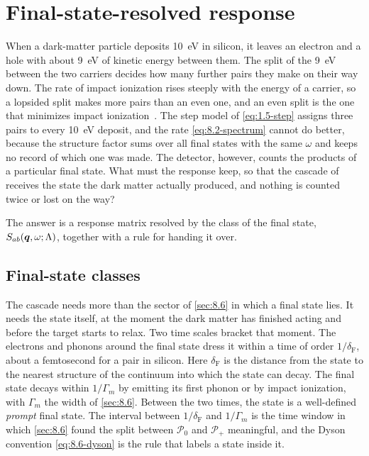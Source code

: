\section{Final-state-resolved response}\label{sec:8.7}

When a dark-matter particle deposits \SI{10}{eV} in silicon, it leaves an electron and a hole with about \SI{9}{eV} of kinetic energy between them. The split of the \SI{9}{eV} between the two carriers decides how many further pairs they make on their way down. The rate of impact ionization rises steeply with the energy of a carrier, so a lopsided split makes more pairs than an even one, and an even split is the one that minimizes impact ionization~\cite[Sect.~II\,A]{ramanathan2020ionization}. The step model of \cref{eq:1.5-step} assigns three pairs to every \SI{10}{eV} deposit, and the rate \cref{eq:8.2-spectrum} cannot do better, because the structure factor sums over all final states with the same $\omega$ and keeps no record of which one was made. The detector, however, counts the products of a particular final state. What must the response keep, so that the cascade of  receives the state the dark matter actually produced, and nothing is counted twice or lost on the way?

The answer is a response matrix resolved by the class of the final state, $S_{ab}(\bm{q},\omega;\Lambda)$, together with a rule for handing it over.

\subsection{Final-state classes}\label{sec:8.7-classes}

The cascade needs more than the sector of \cref{sec:8.6} in which a final state lies. It needs the state itself, at the moment the dark matter has finished acting and before the target starts to relax. Two time scales bracket that moment. The electrons and phonons around the final state dress it within a time of order $1/\delta_{\mathrm{F}}$, about a femtosecond for a pair in silicon. Here $\delta_{\mathrm{F}}$ is the distance from the state to the nearest structure of the continuum into which the state can decay. The final state decays within $1/\varGamma_m$ by emitting its first phonon or by impact ionization, with $\varGamma_m$ the width of \cref{sec:8.6}. Between the two times, the state is a well-defined \emph{prompt} final state. The interval between $1/\delta_{\mathrm{F}}$ and $1/\varGamma_m$ is the time window in which \cref{sec:8.6} found the split between $\mathcal{P}_0$ and $\mathcal{P}_+$ meaningful, and the Dyson convention \cref{eq:8.6-dyson} is the rule that labels a state inside it.

